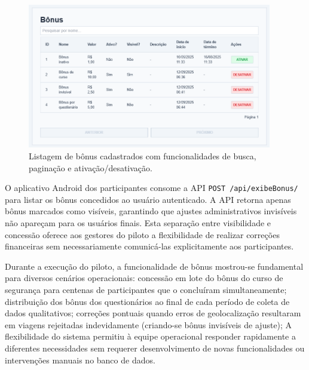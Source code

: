 \begin{figure}[H]
    \centering
    \includegraphics[width=0.95\textwidth]{figuras/bonus_listar.PNG}
    \caption{Listagem de bônus cadastrados com funcionalidades de busca, paginação e ativação/desativação.}
    \label{fig:bonus_listagem_form}
  \end{figure}
 

O aplicativo Android dos participantes
consome a API \texttt{POST /api/exibeBonus/} para listar os bônus concedidos ao
usuário autenticado. A API retorna apenas bônus marcados como visíveis, garantindo que ajustes administrativos invisíveis não
apareçam para os usuários finais. Esta separação entre visibilidade e concessão
oferece aos gestores do piloto a flexibilidade de realizar correções financeiras
sem necessariamente comunicá-las explicitamente aos participantes.

Durante a execução do piloto, a
funcionalidade de bônus mostrou-se fundamental para diversos cenários operacionais:
concessão em lote do bônus do curso de segurança para centenas de participantes que
o concluíram simultaneamente; distribuição dos bônus dos questionários ao final de
cada período de coleta de dados qualitativos; correções pontuais quando erros de
geolocalização resultaram em viagens rejeitadas indevidamente (criando-se bônus
invisíveis de ajuste); A flexibilidade do sistema permitiu à
equipe operacional responder rapidamente a diferentes necessidades sem requerer
desenvolvimento de novas funcionalidades ou intervenções manuais no banco de dados.




